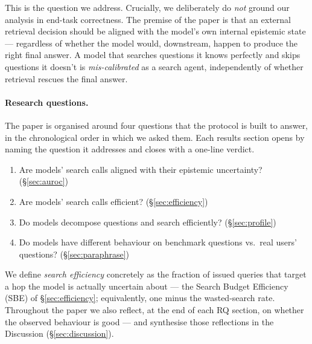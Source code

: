 \documentclass[10pt,letterpaper]{article}
\begin{document}
This is the question we address. Crucially, we deliberately do \emph{not} ground our
analysis in end-task correctness. The premise of the paper is that an external retrieval
decision should be aligned with the model's own internal epistemic state --- regardless of
whether the model would, downstream, happen to produce the right final answer. A model
that searches questions it knows perfectly and skips questions it doesn't is
\emph{mis-calibrated} as a search agent, independently of whether retrieval rescues the
final answer.

\paragraph{Research questions.}
The paper is organised around four questions that the protocol is built to answer, in
the chronological order in which we asked them. Each results section opens by naming
the question it addresses and closes with a one-line verdict.
\begin{enumerate}[leftmargin=*,itemsep=2pt,label=\textbf{RQ\arabic*.}]
\item Are models' search calls aligned with their epistemic uncertainty?
(\S\ref{sec:auroc})
\item Are models' search calls efficient? (\S\ref{sec:efficiency})
\item Do models decompose questions and search efficiently? (\S\ref{sec:profile})
\item Do models have different behaviour on benchmark questions vs.\ real users'
questions? (\S\ref{sec:paraphrase})
\end{enumerate}
We define \emph{search efficiency} concretely as the fraction of issued queries that
target a hop the model is actually uncertain about --- the Search Budget Efficiency
(SBE) of \S\ref{sec:efficiency}; equivalently, one minus the wasted-search rate.
Throughout the paper we also reflect, at the end of each RQ section, on whether the
observed behaviour is good --- and synthesise those reflections in the Discussion
(\S\ref{sec:discussion}).
\end{document}
